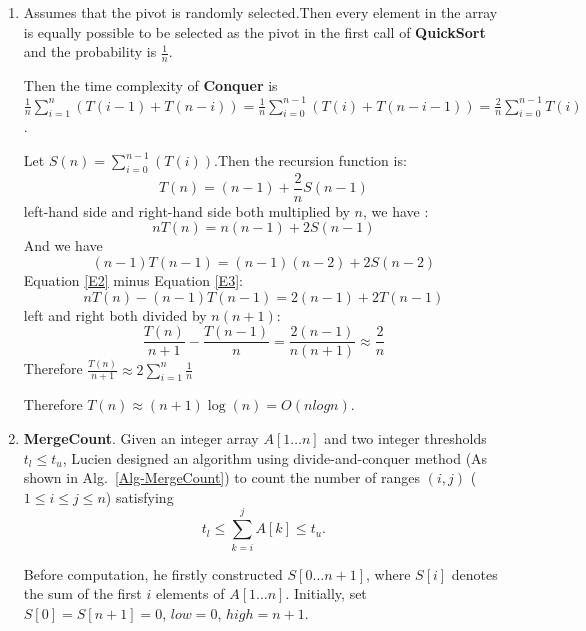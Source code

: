 \documentclass[12pt,a4paper]{article}
\makeatletter
\newtheorem*{solution}{Solution}
\theoremstyle{definition}
\renewenvironment{solution}[1][Solution] {\par\pushQED{\qed}\normalfont\topsep6\p@\@plus6\p@\relax\trivlist\item[\hskip\labelsep\bfseries#1\@addpunct{.}]\ignorespaces}{\popQED\endtrivlist\@endpefalse} \makeatother
\makeatother
\begin{document}
\begin{enumerate}
\begin{solution}
    	Assumes that the pivot is randomly selected.Then every element in the array is equally possible to be selected as the pivot in the first call of \textbf{QuickSort} and the probability is $\frac{1}{n}$.
    	
    	Then the time complexity of \textbf{Conquer} is $\frac{1}{n}\sum_{i=1}^{n}(T(i-1)+T(n-i))=\frac{1}{n}\sum_{i=0}^{n-1}(T(i)+T(n-i-1))=\frac{2}{n}\sum_{i=0}^{n-1}T(i)$.
    	
    	Let $S(n)=\sum_{i=0}^{n-1}(T(i))$.Then the recursion function is:
    	\begin{equation}\label{E1}
    	    T(n)=(n-1)+\frac{2}{n}S(n-1)
    	\end{equation}
    	left-hand side and right-hand side both multiplied by $n$, we have :
    	\begin{equation}\label{E2}
    	    nT(n)=n(n-1)+2S(n-1)
    	\end{equation}
    	And we have 
    	\begin{equation}\label{E3}
    	    (n-1)T(n-1)=(n-1)(n-2)+2S(n-2)
    	\end{equation}
    	Equation \eqref{E2} minus Equation \eqref{E3}:
    	\begin{equation}
    	    nT(n)-(n-1)T(n-1)=2(n-1)+2T(n-1)
    	\end{equation}
    	left and right both divided by $n(n+1)$:
    	\begin{equation}
    	    \frac{T(n)}{n+1}-\frac{T(n-1)}{n}=\frac{2(n-1)}{n(n+1)}\approx\frac{2}{n}
    	\end{equation}
    	Therefore $\frac{T(n)}{n+1}\approx2\sum_{i=1}^{n}\frac{1}{n}$
    	
    	Therefore $T(n)\approx(n+1)\log(n)=O(nlogn)$.
    \end{solution}
    \item
    \textbf{MergeCount}. Given an integer array $A[1 \ldots n]$ and two integer thresholds $t_l \le t_u$, Lucien designed an algorithm using divide-and-conquer method (As shown in Alg.~\ref{Alg-MergeCount}) to count the number of ranges $(i,j)$ ($1 \leq i \leq j \leq n$) satisfying
    \begin{equation}\label{Eqn-MergeCount}
    t_l \leq \sum_{k=i}^{j}{A[k]} \leq t_u.
    \end{equation}

    Before computation, he firstly constructed $S[0 \ldots n+1]$, where $S[i]$ denotes the sum of the first $i$ elements of $A[1 \ldots n]$. Initially, set $S[0]=S[n+1]=0$, $low=0$, $high=n+1$.


\end{enumerate}
\end{document}
